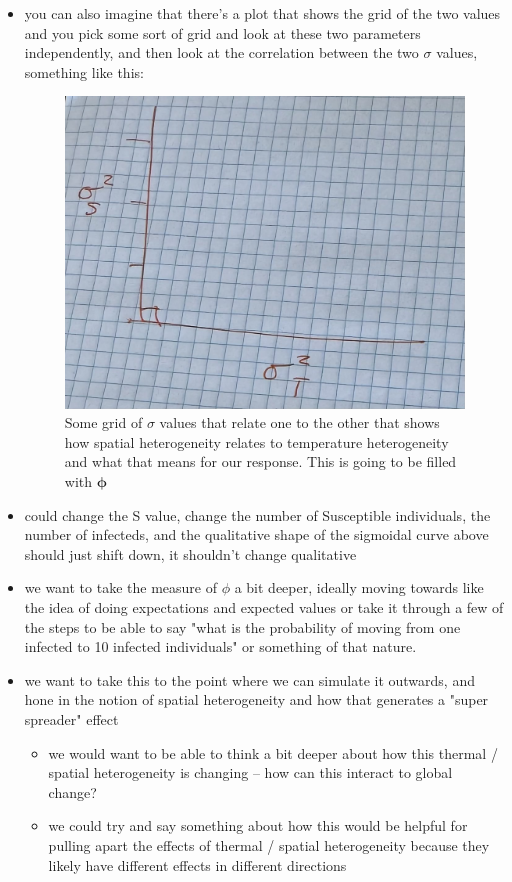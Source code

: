 \documentclass[11pt]{article}
\begin{document}
\begin{itemize}
\item you can also imagine that there's a plot that shows the grid of the two values and you pick some sort of grid and look at these two parameters independently, and then look at the correlation between the two $\sigma$ values, something like this: 

\begin{figure}[!hpt]
    \centering
    \includegraphics[width=0.65\linewidth]{man/notes-figs/sigma-vs-sigma.jpg}
    \caption{Some grid of $\sigma$ values that relate one to the other that shows how spatial heterogeneity relates to temperature heterogeneity and what that means for our response. This is going to be filled with $\mathbf{\phi}$}
    \label{}
\end{figure}

\item could change the S value, change the number of Susceptible individuals, the number of infecteds, and the qualitative shape of the sigmoidal curve above should just shift down, it shouldn't change qualitative 
\item we want to take the measure of $\phi$ a bit deeper, ideally moving towards like the idea of doing expectations and expected values or take it through a few of the steps to be able to say "what is the probability of moving from one infected to 10 infected individuals" or something of that nature. 
\item we want to take this to the point where we can simulate it outwards, and hone in the notion of spatial heterogeneity and how that generates a "super spreader" effect 
    \begin{itemize}
        \item we would want to be able to think a bit deeper about how this thermal / spatial heterogeneity is changing -- how can this interact to global change? 
        \item we could try and say something about how this would be helpful for pulling apart the effects of thermal / spatial heterogeneity because they likely have different effects in different directions 
    \end{itemize}
\end{itemize}
\end{document}
